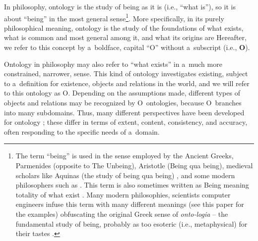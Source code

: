 {{In philosophy, ontology is the study of being as it is (i.e., ``what is''), so it is about ``being'' in the most general sense\footnote{ The term ``being'' is used in the sense employed by the Ancient Greeks, Parmenides (opposite to The Unbeing), Aristotle (Being qua being), medieval scholars like Aquinas (the study of being qua being)
\parencite[][]{kerr_aquinas_2022}, %
 and some modern philosophers such as 
\parencites[][]{jacquette_ontology_2002}[][]{strozewski_ontologia_2004}[or][]{perzanowski_rozprawa_2015}. %
 This term is also sometimes written as Being meaning totality of what exist 
\parencite[][p.160]{kenny_new_2012}. %
 Many modern philosophies, scientists computer engineers infuse this term with many different meanings (see this paper for the examples) obfuscating the original Greek sense of \textit{onto-logia} -- the fundamental study of being, probably as too esoteric (i.e., metaphysical) for their tastes 
\parencites[see also][]{kenny_new_2012}[][]{hofweber_logic_2021}.%
}. More specifically, in its purely philosophical meaning, ontology is the study of the foundations of what exists, what is common and most general among it, and what its origins are 
\parencites[see, e.g.,][]{jacquette_ontology_2002}[][p.32]{strozewski_ontologia_2004} %
 Hereafter, we refer to this concept by a~boldface, capital ``O'' without a~subscript (i.e., \textbf{O}).

Ontology in philosophy may also refer to ``what exists'' in a~much more constrained, narrower, sense. This kind of ontology investigates existing, subject to a~definition for existence, objects and relations in the world, and we will refer to this ontology as O. Depending on the assumptions made, different types of objects and relations may be recognized by O~ontologies, because O~branches into many subdomains. Thus, many different perspectives have been developed for ontology
\parencites*[e.g.,][]{quine_word_1960}[][]{jacquette_ontology_2002}[][]{strozewski_ontologia_2004}[][]{baker_metaphysics_2007}[][]{chalmers_metametaphysics_2009}[][]{effingham_introduction_2013}[][]{ingarden_controversy_2013}[][]{ingarden_controversy_2016}[][]{berto_ontology_2015}[][]{perzanowski_rozprawa_2015}[][]{thomasson_ontology_2015}[][]{hofweber_logic_2021}; %
 these differ in terms of extent, content, consistency, and accuracy, often responding to the specific needs of a~domain.

}}
